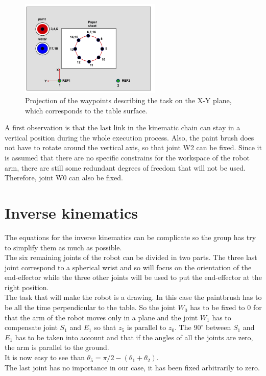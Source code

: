 \begin{figure}[h!]
	\centering
    \includegraphics[width = 0.6\textwidth]{Images/Task}
    \caption{Projection of the waypoints describing the task on the X-Y plane, which corresponds to the table surface.}
    \label{fig:Task}
\end{figure}

\bigskip
A first observation is that the last link in the kinematic chain can stay in a vertical position during the whole execution process. Also, the paint brush does not have to rotate around the vertical axis, so that joint W2 can be fixed. Since it is assumed that there are no specific constrains for the workspace of the robot arm, there are still some redundant degrees of freedom that will not be used. Therefore, joint W0 can also be fixed.


\section{Inverse kinematics}

The equations for the inverse kinematics can be complicate so the group has try to simplify them as much as possible.\\
The six remaining joints of the robot can be divided in two parts. The three last joint correspond to a spherical wrist and so will focus on the orientation of the end-effector while the three other joints will be used to put the end-effector at the right position.\\

The task that will make the robot is a drawing. In this case the paintbrush has to be all the time perpendicular to the table. So the joint $W_0$ has to be fixed to 0 for that the arm of the robot moves only in a plane and the joint $W_1$ has to compensate joint $S_1$ and $E_1$ so that $z_5$ is parallel to $z_0$. The $90^{\circ}$ between $S_1$ and $E_1$ has to be taken into account and that if the angles of all the joints are zero, the arm is parallel to the ground.\\
It is now easy to see than $\theta_5 = \pi /2 - (\theta_1 + \theta_2)$. \\
The last joint has no importance in our case, it has been fixed arbitrarily to zero.\\

